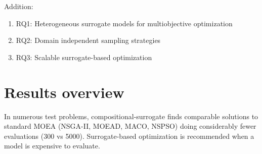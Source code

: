 Addition:
\begin{enumerate}
    \item RQ1: Heterogeneous surrogate models for multiobjective optimization
    \item RQ2: Domain independent sampling strategies
    \item RQ3: Scalable surrogate-based optimization 
\end{enumerate}

\section{Results overview}
In numerous test problems, compositional-surrogate finds comparable solutions to standard MOEA (NSGA-II, MOEAD, MACO, NSPSO) doing considerably fewer evaluations (300 vs 5000). 
Surrogate-based optimization is recommended when a model is expensive to evaluate.


